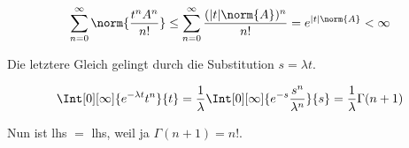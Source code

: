 \begin{solution}
\begin{align*}
  \sum_{n=0}^\infty
  \norm{\frac{t^n A^n}{n!}}
  \leq
  \sum_{n=0}^\infty
  \frac{(|t| \norm{A})^n}{n!}
  =
  e^{|t| \norm{A}} < \infty
\end{align*}

Die letztere Gleich gelingt durch die Substitution $s = \lambda t$.

\begin{align*}
  \Int[0][\infty]{e^{-\lambda t} t^n}{t}
  =
  \frac{1}{\lambda}
  \Int
  [0][\infty]
  {
    e^{-s}
    \frac{s^n}{\lambda^n}
  }{s}
  =
  \frac{1}{\lambda}
  \Gamma(n+1)
\end{align*}

Nun ist lhs $=$ lhs, weil ja $\Gamma(n+1) = n!$.

\end{solution}

